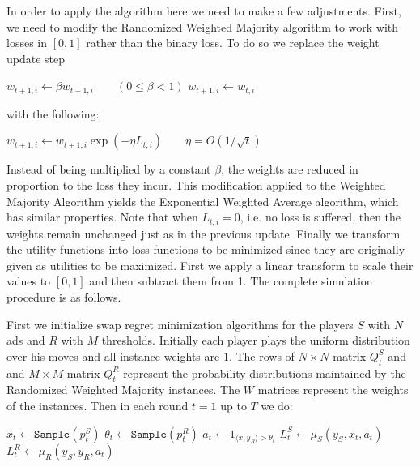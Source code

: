 \documentclass{article}
\begin{document}
In order to apply the algorithm here we need to make a few adjustments. First, we need to modify the Randomized Weighted Majority algorithm to work with losses in $[0,1]$ rather than the binary loss. To do so we replace the weight update step
\begin{algorithmic}
    \State $w_{t+1,i} \leftarrow \beta w_{t+1,i} \quad\quad(0 \le \beta < 1)$
\Else
    \State $w_{t+1,i} \leftarrow w_{t,i}$
\EndIf
\end{algorithmic}
with the following:
\begin{algorithmic}
\State $w_{t+1,i} \leftarrow w_{t+1,i} \exp(-\eta L_{t,i}) \quad\quad \eta = O\left(1/\sqrt{t}\right)$
\end{algorithmic}
Instead of being multiplied by a constant $\beta$, the weights are reduced in proportion to the loss they incur. This modification applied to the Weighted Majority Algorithm yields the Exponential Weighted Average algorithm, which has similar properties. Note that when $L_{t,i} = 0$, i.e. no loss is suffered, then the weights remain unchanged just as in the previous update. Finally we transform the utility functions into loss functions to be minimized since they are originally given as utilities to be maximized. First we apply a linear transform to scale their values to $[0,1]$ and then subtract them from 1.
The complete simulation procedure is as follows.
\begin{algorithmic}[1]
\EndFor
{}
\EndFor
\end{algorithmic}
First we initialize swap regret minimization algorithms for the players $S$ with $N$ ads and $R$ with $M$ thresholds. Initially each player plays the uniform distribution over his moves and all instance weights are $1$. The rows of $N\times N$ matrix $Q_t^S$ and and $M\times M$ matrix $Q_t^R$ represent the probability distributions maintained by the Randomized Weighted Majority instances. The $W$ matrices represent the weights of the instances. Then in each round $t=1$ up to $T$ we do:
\begin{algorithmic}
\State $x_t \leftarrow \texttt{Sample}(p_t^S)$
\State $\theta_t \leftarrow \texttt{Sample}(p_t^R)$
\State $a_t \leftarrow 1_{\langle x, y_R \rangle > \theta_t}$
\State $L_t^S \leftarrow \mu_S(y_S,x_t,a_t)$
\State $L_t^R \leftarrow \mu_R(y_S,y_R,a_t)$
\end{algorithmic}
\end{document}

